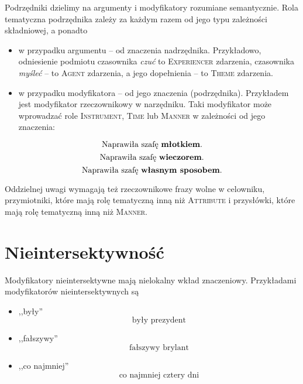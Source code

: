 \documentclass[a4paper, 12pt]{article}
\theoremstyle{remark}
\newcommand{\experiencer}{\textsc{Experiencer}}
\newcommand{\agent}{\textsc{Agent}}
\newcommand{\theme}{\textsc{Theme}}
\begin{document}
Podrzędniki dzielimy na argumenty i modyfikatory rozumiane semantycznie. Rola tematyczna podrzędnika zależy za każdym razem od 
jego typu zależności składniowej, a ponadto
\begin{itemize}
	\item w przypadku argumentu -- od znaczenia nadrzędnika.
Przykładowo, odniesienie podmiotu czasownika \emph{czuć} to \experiencer{} zdarzenia, czasownika \emph{myśleć} -- to \agent{} zdarzenia, a jego dopełnienia -- to \theme{} zdarzenia.
\item w przypadku modyfikatora -- od jego znaczenia (podrzędnika).
Przykładem jest modyfikator rzeczownikowy w narzędniku. Taki modyfikator może wprowadzać role \textsc{Instrument}, \textsc{Time} lub \textsc{Manner} w zależności od jego znaczenia:
\end{itemize}
\begin{equation}
	\text{Naprawiła szafę \textbf{młotkiem}.} 
\end{equation}
\begin{equation}
	\text{Naprawiła szafę \textbf{wieczorem}.} 
\end{equation}
\begin{equation}
	\text{Naprawiła szafę \textbf{własnym sposobem}.} 
\end{equation}

Oddzielnej uwagi wymagają też rzeczownikowe frazy wolne w celowniku,
przymiotniki, które mają rolę tematyczną inną niż \textsc{Attribute}
i przysłówki, które mają rolę tematyczną inną niż \textsc{Manner}.

\section{Nieintersektywność}

Modyfikatory nieintersektywne mają nielokalny wkład znaczeniowy. Przykładami modyfikatorów nieintersektywnych są
\begin{itemize}
\item ,,były''
\begin{equation}
	\text{były prezydent}
\end{equation}
\item ,,fałszywy''
\begin{equation}
	\text{fałszywy brylant}
\end{equation}
\item ,,co najmniej''
\begin{equation}
	\text{co najmniej cztery dni}
\end{equation}
\end{itemize}
\end{document}
